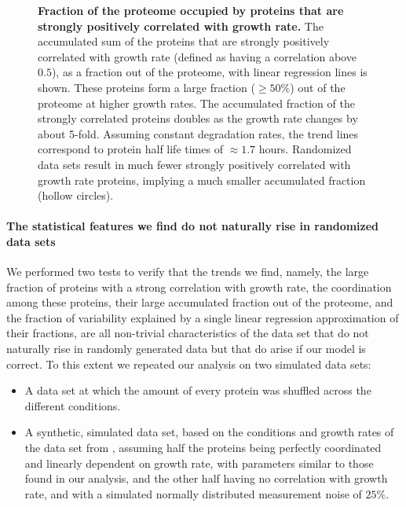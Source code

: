 \documentclass[10pt,letterpaper]{article}
\begin{document}
\begin{figure}[h]
\begin{center}
\caption{\label{fig:globalgrcorr}
{\bf Fraction of the proteome occupied by proteins that are strongly positively correlated with growth rate.}
The accumulated sum of the proteins that are strongly positively correlated with growth rate (defined as having a correlation above $0.5$), as a fraction out of the proteome, with linear regression lines is shown.
These proteins form a large fraction ($\ge 50\%$) out of the proteome at higher growth rates.
The accumulated fraction of the strongly correlated proteins doubles as the growth rate changes by about 5-fold.
Assuming constant degradation rates, the trend lines correspond to protein half life times of $\approx 1.7$ hours.
Randomized data sets result in much fewer strongly positively correlated with growth rate proteins, implying a much smaller accumulated fraction (hollow circles).
%
}
\end{center}
\end{figure}

\paragraph{The statistical features we find do not naturally rise in randomized data sets}

We performed two tests to verify that the trends we find, namely, the large fraction of proteins with a strong correlation with growth rate, the coordination among these proteins, their large accumulated fraction out of the proteome, and the fraction of variability explained by a single linear regression approximation of their fractions, are all non-trivial characteristics of the data set that do not naturally rise in randomly generated data but that do arise if our model is correct.
To this extent we repeated our analysis on two simulated data sets:
\begin{itemize}
\item A data set at which the amount of every protein was shuffled across the different conditions.
\item A synthetic, simulated data set, based on the conditions and growth rates of the data set from \cite{Schmidt2015}, assuming half the proteins being perfectly coordinated and linearly dependent on growth rate, with parameters similar to those found in our analysis, and the other half having no correlation with growth rate, and with a simulated normally distributed measurement noise of $25\%$.
\end{itemize}
\end{document}
